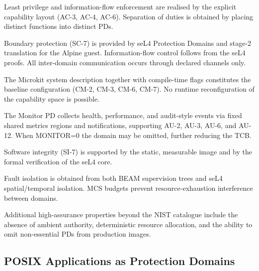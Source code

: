 \documentclass{article}
\begin{document}
\begin{description}[style=nextline,leftmargin=1.2cm]
  \item[AC --- Access Control]  
        Least privilege and information-flow enforcement are realised by the
        explicit capability layout (AC-3, AC-4, AC-6). Separation of duties is
        obtained by placing distinct functions into distinct PDs.

  \item[SC --- System and Communications Protection]  
        Boundary protection (SC-7) is provided by seL4 Protection Domains and
        stage-2 translation for the Alpine guest. Information-flow control follows
        from the seL4 proofs. All inter-domain communication occurs through
        declared channels only.

  \item[CM --- Configuration Management]  
        The Microkit system description together with compile-time flags
        constitutes the baseline configuration (CM-2, CM-3, CM-6, CM-7). No
        runtime reconfiguration of the capability space is possible.

  \item[AU --- Audit and Accountability]  
        The Monitor PD collects health, performance, and audit-style events via
        fixed shared metrics regions and notifications, supporting AU-2, AU-3,
        AU-6, and AU-12. When MONITOR=0 the domain may be omitted, further
        reducing the TCB.

  \item[SI --- System and Information Integrity]  
        Software integrity (SI-7) is supported by the static, measurable image
        and by the formal verification of the seL4 core.

  \item[CP --- Contingency Planning]  
        Fault isolation is obtained from both BEAM supervision trees and seL4
        spatial/temporal isolation. MCS budgets prevent resource-exhaustion
        interference between domains.
\end{description}

Additional high-assurance properties beyond the NIST catalogue include the
absence of ambient authority, deterministic resource allocation, and the
ability to omit non-essential PDs from production images.

\subsection{POSIX Applications as Protection Domains}
\label{sec:posix-pds}
\end{document}
